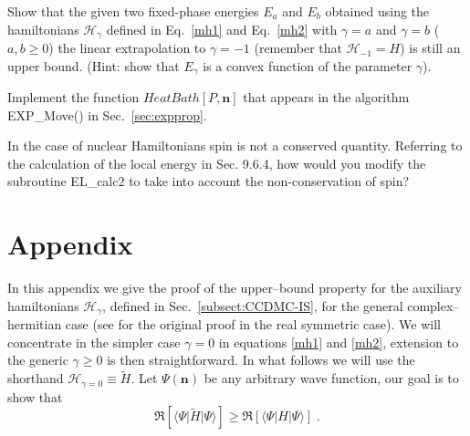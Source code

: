   \begin{prob}
  \label{prob:egamma}
	Show that the given two fixed-phase energies $E_{a}$ and $E_{b}$ obtained using the hamiltonians $\mathcal{H}_{\gamma}$ defined in Eq.~\eqref{mh1} and Eq.~\eqref{mh2} 
	with $\gamma=a$ and $\gamma=b$ ($a,b\geq 0$) the linear extrapolation to $\gamma=-1$ (remember that $\mathcal{H}_{-1}=H$) is still an upper bound. 
	(Hint: show that $E_\gamma$ is a convex function of the parameter $\gamma$).
  \end{prob}
  \begin{prob}
  \label{prob:heatbath}
        Implement the function $HeatBath[P,\mathbf{n}]$ that appears in the algorithm EXP\_Move() in Sec.~\ref{sec:expprop}.
  \end{prob}
\begin{prob}
In the case of nuclear Hamiltonians spin is not a conserved quantity. Referring to the calculation of the local energy in Sec. 9.6.4, how would you modify the subroutine EL\_calc2 to take into account the non-conservation of spin?
\end{prob}
  

\section*{Appendix}
In this appendix we give the proof of the upper--bound property for the auxiliary hamiltonians $\mathcal{H}_{\gamma}$, defined in Sec.~\ref{subsect:CCDMC-IS}, for
the general complex--hermitian case (see \cite{TenHaaf95} for the original proof in the real symmetric case).
We will concentrate in the simpler case $\gamma=0$ in equations \eqref{mh1} and \eqref{mh2}, extension to the generic $\gamma \geq 0$ is then straightforward. In what follows
 we will use the shorthand $\mathcal{H}_{\gamma=0} \equiv \widetilde{H}$. Let $\Psi(\mathbf{n})$ be any arbitrary wave function, our goal is to show that 
\begin{equation}
\Re [\langle \Psi \lvert \widetilde{H}\rvert\Psi \rangle]\geq\Re\left[ \langle \Psi |H|\Psi \rangle\right]\;. 
\end{equation}

